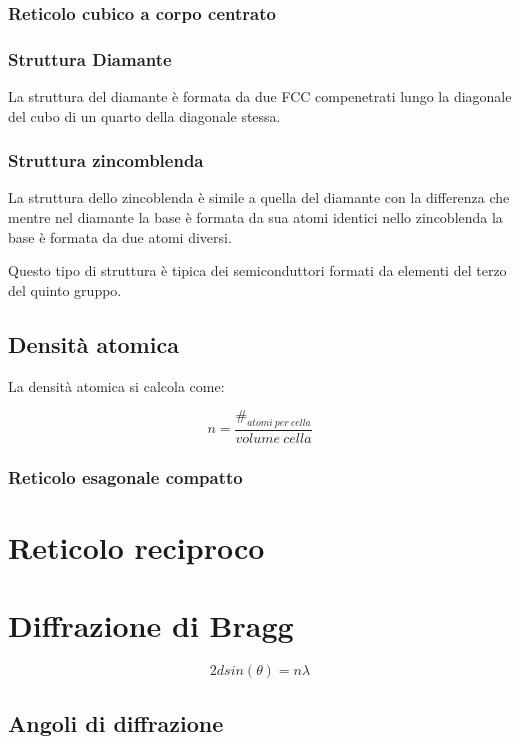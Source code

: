 \documentclass[10pt,a4paper]{report}
\begin{document}
		\subsection{Reticolo cubico a corpo centrato}

	
		\subsection{Struttura Diamante}
				La struttura del diamante è formata da due FCC compenetrati lungo la diagonale del cubo di un quarto della diagonale stessa.
			
		\subsection{Struttura zincomblenda}
				La struttura dello zincoblenda è simile a quella del diamante con la differenza che mentre nel diamante la base è formata da sua atomi identici nello zincoblenda la base è formata da due atomi diversi.

				Questo tipo di struttura è tipica dei semiconduttori formati da elementi del terzo del quinto gruppo.

		\section{Densità atomica}
		La densità atomica si calcola come:

		\[
		n=\frac{\#_{atomi \ per \ cella}}{volume \ cella}
		\]

		\subsection{Reticolo esagonale compatto}



\chapter{Reticolo reciproco}

\chapter{Diffrazione di Bragg}

\[
2dsin(\theta)=n\lambda
\]

	\section{Angoli di diffrazione}
\end{document}
